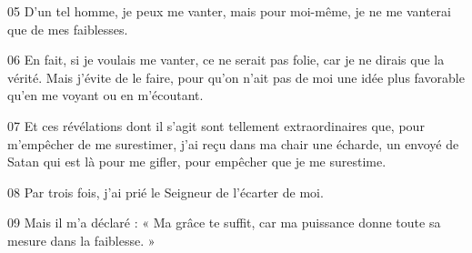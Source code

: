 
05 D’un tel homme, je peux me vanter, mais pour moi-même, je ne me vanterai que de mes faiblesses.

06 En fait, si je voulais me vanter, ce ne serait pas folie, car je ne dirais que la vérité. Mais j’évite de le faire, pour qu’on n’ait pas de moi une idée plus favorable qu’en me voyant ou en m’écoutant.

07 Et ces révélations dont il s’agit sont tellement extraordinaires que, pour m’empêcher de me surestimer, j’ai reçu dans ma chair une écharde, un envoyé de Satan qui est là pour me gifler, pour empêcher que je me surestime.

08 Par trois fois, j’ai prié le Seigneur de l’écarter de moi.

09 Mais il m’a déclaré : « Ma grâce te suffit, car ma puissance donne toute sa mesure dans la faiblesse. » 